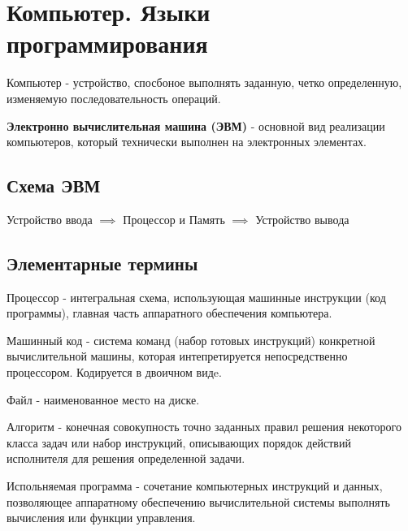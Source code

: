 \section{Компьютер. Языки программирования}

\begin{definition}
  Компьютер - устройство, спосбоное выполнять заданную, четко определенную, изменяемую последовательность операций.
\end{definition}

\begin{definition}
  \textbf{Электронно вычислительная машина (ЭВМ)} - основной вид реализации компьютеров, который технически выполнен на электронных элементах.
\end{definition}

\subsection{Схема ЭВМ}

Устройство ввода $\implies$ Процессор и Память $\implies$ Устройство вывода

\subsection{Элементарные термины}

\begin{definition}
  Процессор - интегральная схема, использующая машинные инструкции (код программы), главная часть аппаратного обеспечения компьютера.
\end{definition}

\begin{definition}
  Машинный код - система команд (набор готовых инструкций) конкретной вычислительной машины, которая интепретируется непосредственно процессором. Кодируется в двоичном видe.
\end{definition}

\begin{definition}
  Файл - наименованное место на диске.
\end{definition}

\begin{definition}
  Алгоритм - конечная совокупность точно заданных правил решения некоторого класса задач или набор инструкций, описывающих порядок действий исполнителя для решения определенной задачи.
\end{definition}

\begin{definition}
  Испольняемая программа - сочетание компьютерных инструкций и данных, позволяющее аппаратному обеспечению вычислительной системы выполнять вычисления или функции управления.
\end{definition}

